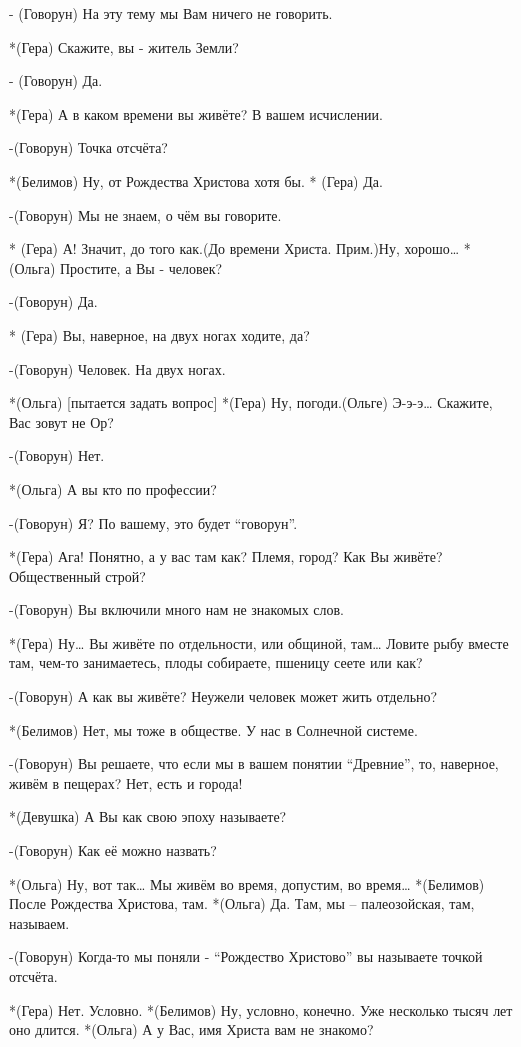 - (Говорун) На эту тему мы Вам ничего не говорить.

*(Гера) Скажите, вы - житель Земли?

- (Говорун) Да.

*(Гера) А в каком времени вы живёте? В вашем исчислении.

-(Говорун) Точка отсчёта?

*(Белимов) Ну, от Рождества Христова хотя бы.
* (Гера) Да.

-(Говорун) Мы не знаем, о чём вы говорите.

* (Гера) А! Значит, до того как.(До времени Христа. Прим.)Ну, хорошо…
* (Ольга) Простите, а Вы - человек?

-(Говорун) Да.

* (Гера) Вы, наверное, на двух ногах ходите, да?

-(Говорун) Человек.  На двух ногах.

*(Ольга) [пытается задать вопрос]
*(Гера) Ну, погоди.(Ольге) Э-э-э… Скажите, Вас зовут не Ор?

-(Говорун) Нет.

*(Ольга) А вы кто по профессии?

-(Говорун) Я? По вашему,  это будет “говорун”.

*(Гера) Ага! Понятно, а у вас там как? Племя, город? Как Вы живёте? Общественный строй?

-(Говорун) Вы включили много нам не знакомых слов.

*(Гера) Ну… Вы живёте по отдельности, или общиной, там… Ловите рыбу вместе там, чем-то занимаетесь, плоды собираете, пшеницу сеете или как? 

-(Говорун) А как вы живёте? Неужели человек может жить отдельно?

*(Белимов) Нет, мы тоже в обществе. У нас в Солнечной системе.

-(Говорун) Вы решаете, что если мы в вашем понятии “Древние”, то, наверное, живём в пещерах? Нет, есть и города!

*(Девушка) А Вы как свою эпоху называете?

-(Говорун) Как её можно назвать?

*(Ольга) Ну, вот так… Мы живём во время, допустим, во время…
*(Белимов) После Рождества Христова, там.
*(Ольга) Да. Там, мы – палеозойская, там, называем.

-(Говорун) Когда-то мы поняли  -  “Рождество Христово” вы называете точкой отсчёта. 

*(Гера) Нет. Условно.
*(Белимов) Ну, условно, конечно. Уже несколько тысяч лет оно длится. 
*(Ольга) А у Вас, имя Христа вам не знакомо?


